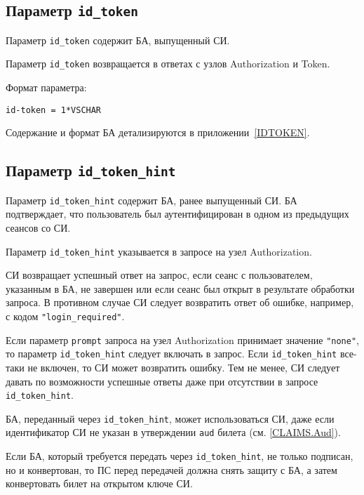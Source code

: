 \subsection{Параметр \lstinline{id_token}}\label{PARAMS.IdToken}

Параметр \lstinline{id_token} содержит БА, выпущенный СИ.

Параметр \lstinline{id_token} возвращается в ответах с узлов Authorization и Token.

Формат параметра: 
\begin{lstlisting}
id-token = 1*VSCHAR
\end{lstlisting}

Содержание и формат БА детализируются в приложении~\ref{IDTOKEN}. 


\subsection{Параметр \lstinline{id_token_hint}}\label{PARAMS.IdTokenHint}

Параметр \lstinline{id_token_hint} содержит БА, ранее выпущенный СИ.
БА подтверждает, что пользователь был аутентифицирован в одном из предыдущих 
сеансов со СИ.

Параметр \lstinline{id_token_hint} указывается в запросе на узел Authorization. 

СИ возвращает успешный ответ на запрос, если сеанс с пользователем, указанным в 
БА, не завершен или если сеанс был открыт в результате обработки запроса. В 
противном случае СИ следует возвратить ответ об ошибке, например, с кодом 
\lstinline{"login_required"}.

Если параметр \lstinline{prompt} запроса на узел Authorization 
принимает значение \lstinline{"none"}, то параметр \lstinline{id_token_hint} 
следует включать в запрос. 
%
Если \lstinline{id_token_hint} все-таки не включен, то СИ может возвратить 
ошибку.
%
Тем не менее, СИ следует давать по возможности успешные ответы даже при 
отсутствии в запросе \lstinline{id_token_hint}.

БА, переданный через \lstinline{id_token_hint}, может использоваться СИ, 
даже если идентификатор СИ не указан в утверждении \lstinline{aud} билета 
(см. \ref{CLAIMS.Aud}).

Если БА, который требуется передать через \lstinline{id_token_hint}, 
не только подписан, но и конвертован, то ПС перед передачей должна снять защиту 
с БА, а затем конвертовать билет на открытом ключе СИ.

